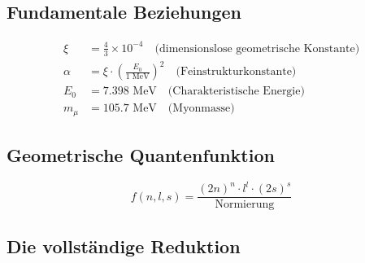 	\subsection{Fundamentale Beziehungen}
	
	\begin{align}
		\xi &= \frac{4}{3} \times 10^{-4} \quad \text{(dimensionslose geometrische Konstante)}\\
		\alpha &= \xi \cdot \left(\frac{E_0}{1 \text{ MeV}}\right)^2 \quad \text{(Feinstrukturkonstante)}\\
		E_0 &= 7.398 \text{ MeV} \quad \text{(Charakteristische Energie)}\\
		m_\mu &= 105.7 \text{ MeV} \quad \text{(Myonmasse)}
	\end{align}
	
	\subsection{Geometrische Quantenfunktion}
	
	\begin{equation}
		f(n,l,s) = \frac{(2n)^n \cdot l^l \cdot (2s)^s}{\text{Normierung}}
	\end{equation}
	
	\begin{center}
	\end{center}
	
	\subsection{Die vollständige Reduktion}
	
